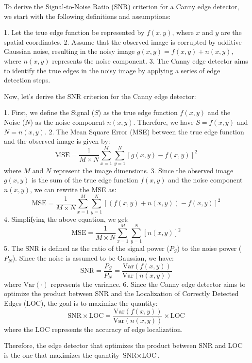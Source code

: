 \documentclass{article}
\begin{document}
To derive the Signal-to-Noise Ratio (SNR) criterion for a Canny edge detector, we start with the following definitions and assumptions:

1. Let the true edge function be represented by \(f(x, y)\), where \(x\) and \(y\) are the spatial coordinates.
2. Assume that the observed image is corrupted by additive Gaussian noise, resulting in the noisy image \(g(x, y) = f(x, y) + n(x, y)\), where \(n(x, y)\) represents the noise component.
3. The Canny edge detector aims to identify the true edges in the noisy image by applying a series of edge detection steps.

Now, let's derive the SNR criterion for the Canny edge detector:

1. First, we define the Signal (\(S\)) as the true edge function \(f(x, y)\) and the Noise (\(N\)) as the noise component \(n(x, y)\). Therefore, we have \(S = f(x, y)\) and \(N = n(x, y)\).
2. The Mean Square Error (MSE) between the true edge function and the observed image is given by:
   \[
   \text{MSE} = \frac{1}{M \times N} \sum_{x=1}^{M} \sum_{y=1}^{N} [g(x, y) - f(x, y)]^2
   \]
   where \(M\) and \(N\) represent the image dimensions.
3. Since the observed image \(g(x, y)\) is the sum of the true edge function \(f(x, y)\) and the noise component \(n(x, y)\), we can rewrite the MSE as:
   \[
   \text{MSE} = \frac{1}{M \times N} \sum_{x=1}^{M} \sum_{y=1}^{N} [(f(x, y) + n(x, y)) - f(x, y)]^2
   \]
4. Simplifying the above equation, we get:
   \[
   \text{MSE} = \frac{1}{M \times N} \sum_{x=1}^{M} \sum_{y=1}^{N} [n(x, y)]^2
   \]
5. The SNR is defined as the ratio of the signal power (\(P_S\)) to the noise power (\(P_N\)). Since the noise is assumed to be Gaussian, we have:
   \[
   \text{SNR} = \frac{P_S}{P_N} = \frac{\text{Var}(f(x, y))}{\text{Var}(n(x, y))}
   \]
   where \(\text{Var}(\cdot)\) represents the variance.
6. Since the Canny edge detector aims to optimize the product between SNR and the Localization of Correctly Detected Edges (LOC), the goal is to maximize the quantity:
   \[
   \text{SNR} \times \text{LOC} = \frac{\text{Var}(f(x, y))}{\text{Var}(n(x, y))} \times \text{LOC}
   \]
   where the LOC represents the accuracy of edge localization.

Therefore, the edge detector that optimizes the product between SNR and LOC is the one that maximizes the quantity \(\text{SNR} \times \text{LOC}\).
\end{document}
